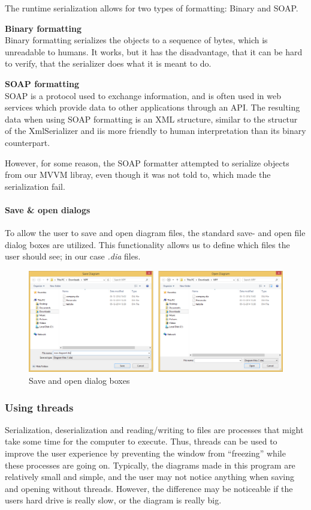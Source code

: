 
The runtime serialization allows for two types of formatting: Binary and SOAP.

\textbf{Binary formatting}\\
Binary formatting serializes the objects to a
sequence of bytes, which is unreadable to humans. It works, but it has the
disadvantage, that it can be hard to verify, that the serializer does what it is
meant to do.

\textbf{SOAP formatting}\\
SOAP is a protocol used to exchange information, and
is often used in web services which provide data to other applications through
an API. The resulting data when using SOAP formatting is an XML structure,
similar to the structur of the XmlSerializer and iis more friendly to human
interpretation than its binary counterpart.

However, for some reason, the SOAP formatter attempted to serialize objects from
our MVVM libray, even though it was not told to, which made the serialization
fail.

\paragraph{Save \& open dialogs}
To allow the user to save and open diagram files, the standard save- and open 
file dialog boxes are utilized. This functionality allows us to define which 
files the user should see; in our case \emph{.dia} files.

\begin{figure}[H]
	\centering
	\includegraphics[width=\linewidth]{img/save_open.png}
	\caption{Save and open dialog boxes \label{saveopen}}
\end{figure}

\subsubsection{Using threads}
Serialization, deserialization and reading/writing
to files are processes that might take some time for the computer to execute.
Thus, threads can be used to improve the user experience by preventing the
window from “freezing” while these processes are going on. Typically, the
diagrams made in this program are relatively small and simple, and the user may
not notice anything when saving and opening without threads. However, the
difference may be noticeable if the users hard drive is really slow, or the
diagram is really big.

